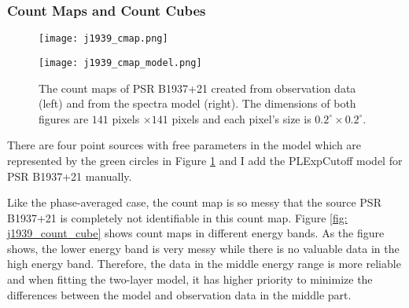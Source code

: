 \documentclass[12pt]{report}
\begin{document}
      \subsubsection{Count Maps and Count Cubes}
        \begin{figure}[!ht]
          \begin{center}
          \begin{minipage}{0.45\textwidth}
            \begin{center} 
              \texttt{[image: j1939\_cmap.png]}
            \end{center}
          \end{minipage}
          \begin{minipage}{0.45\textwidth}
            \begin{center}
              \texttt{[image: j1939\_cmap\_model.png]}
            \end{center}
          \end{minipage}
          \end{center}
          \caption{The count maps of PSR B1937+21 created from observation 
              data (left) and from the spectra model (right). The dimensions
              of both figures are $141$ pixels $\times 141$ pixels and each pixel's size is
              $0.2^{\circ}\times0.2^{\circ}$.}
            \label{fig: j1939_count_map}
        \end{figure}

        There are four point sources with free parameters in the model which are represented 
        by the green circles in Figure \ref{fig: j1939_count_map} and I add the PLExpCutoff model 
        for PSR B1937+21 manually. 

        Like the phase-averaged case, the count map is so messy that the source PSR B1937+21 
        is completely not identifiable in this count map.  
        Figure \ref{fig: j1939_count_cube} shows count maps in different energy bands. As 
        the figure shows, the lower energy band is very messy while there is no valuable  
        data in the high energy band. Therefore, the data in the middle energy range is 
        more reliable and when fitting the two-layer model, it has higher priority to 
        minimize the differences between the model and observation data in the middle part.
\end{document}
